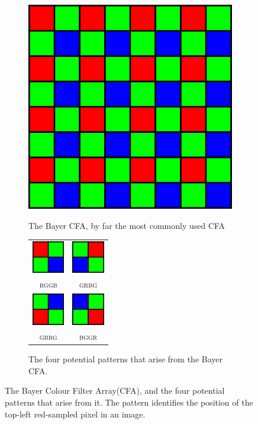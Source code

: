 \documentclass{ipol}
\begin{document}
\begin{figure}[ht]
        \centering
        \begin{subfigure}{.4\linewidth}
                \centering
                \includegraphics[width=.6\linewidth]{images/cfa.png}
                \label{fig:bayer}
                \caption{The Bayer CFA, by far the most commonly used CFA}
        \end{subfigure}\hfill%
        \begin{subfigure}{.6\linewidth}
                \centering
                \begin{tabular}{cc}
                        \includegraphics[width=40pt]{images/rggb.png}&\includegraphics[width=40pt]{images/grbg.png}\\
                        \textsc{rggb}&\textsc{grbg}\\
                        \includegraphics[width=40pt]{images/gbrg.png}&\includegraphics[width=40pt]{images/bggr.png}\\
                        \textsc{gbrg}&\textsc{bggr}\\
                \end{tabular}
                \label{fig:4patterns}
                \caption{The four potential patterns that arise from the Bayer CFA.}
        \end{subfigure}
        \caption{The Bayer Colour Filter Array(CFA), and the four potential patterns that arise from it. The pattern identifies the position of the top-left red-sampled pixel in an image.}
\end{figure}
\end{document}
